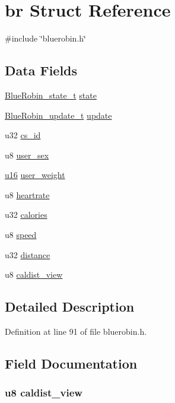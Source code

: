 \hypertarget{structbr}{\section{br \-Struct \-Reference}
\label{structbr}
}


{\ttfamily \#include \char`\"{}bluerobin.\-h\char`\"{}}

\subsection*{\-Data \-Fields}
\begin{DoxyCompactItemize}
\item 
\hyperlink{bluerobin_8h_ad20ae2c6baea60c64e9ce5c25924aaef}{\-Blue\-Robin\-\_\-state\-\_\-t} \hyperlink{structbr_a0929ffe8f07d1756ee75c71fb89d12bc}{state}
\item 
\hyperlink{bluerobin_8h_a303857eaff917940fdb83fbbef489e37}{\-Blue\-Robin\-\_\-update\-\_\-t} \hyperlink{structbr_a8cc6727deeda7edbd8a611f7436081ea}{update}
\item 
u32 \hyperlink{structbr_a263ffd4cf64b95e482bc27f852af2bef}{cs\-\_\-id}
\item 
u8 \hyperlink{structbr_a753dfdbb988f7a6c3cba1da48987c9ba}{user\-\_\-sex}
\item 
\hyperlink{main__ED__BM_8c_a9e6c91d77e24643b888dbd1a1a590054}{u16} \hyperlink{structbr_afbd1f6401c61aa55759c487e35ad9ff2}{user\-\_\-weight}
\item 
u8 \hyperlink{structbr_ad97e8f663ca7030a5b41d37c3966d882}{heartrate}
\item 
u32 \hyperlink{structbr_ad2b1b631c0edcaa1b2dcd6408dc2513e}{calories}
\item 
u8 \hyperlink{structbr_a02f32f73f06efbe4be71730fb1995a24}{speed}
\item 
u32 \hyperlink{structbr_ab5571a66c69793c55a165d01293371d4}{distance}
\item 
u8 \hyperlink{structbr_a2aede10efd9768f20b47ddbf41f11b99}{caldist\-\_\-view}
\end{DoxyCompactItemize}


\subsection{\-Detailed \-Description}


\-Definition at line 91 of file bluerobin.\-h.



\subsection{\-Field \-Documentation}
\hypertarget{structbr_a2aede10efd9768f20b47ddbf41f11b99}{
\subsubsection[{caldist\-\_\-view}]{\setlength{\rightskip}{0pt plus 5cm}u8 {\bf caldist\-\_\-view}}}\label{structbr_a2aede10efd9768f20b47ddbf41f11b99}


